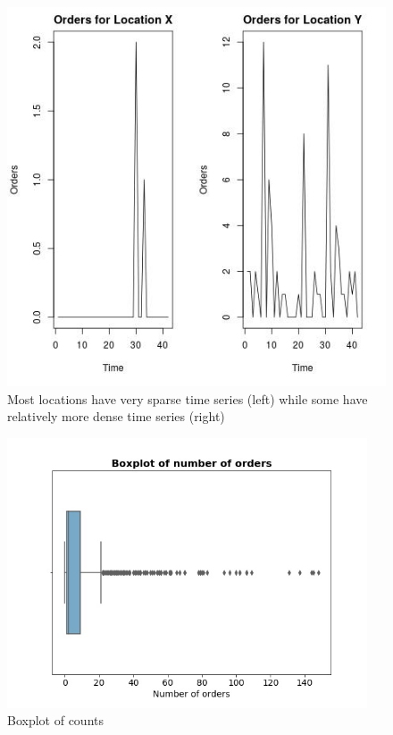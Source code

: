 \documentclass[12pt, letterpaper] {article}
\begin{document}
\begin{figure}[H]
    \centering
    \includegraphics[width=\textwidth, height=0.4\textheight] {Images/example_ts.jpg}
    \caption{Most locations have very sparse time series (left) while some have relatively more dense time series (right)}
    \label{fig:Most locations have very sparse time series (left) while some have relatively more dense time series (right)}
\end{figure}


\begin{figure}[H]
    \centering
    \includegraphics[width=0.95\textwidth, height=0.4\textheight]{Images/boxplot_counts.jpg}
    \caption{Boxplot of counts}
    \label{fig:Boxplot of counts}
\end{figure}
\end{document}
